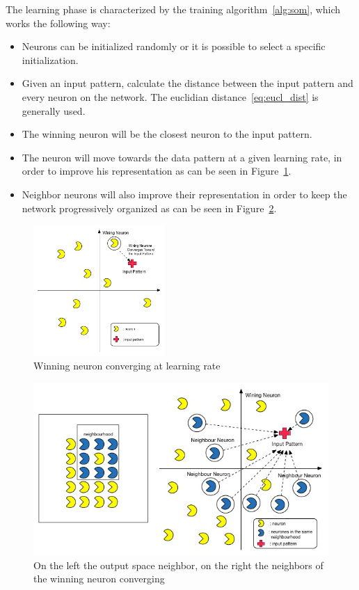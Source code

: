 

The learning phase is characterized by the training algorithm~\ref{alg:som}, which works the following way:
\begin{itemize}
  \item Neurons can be initialized randomly or it is possible to select a specific initialization.
  \item Given an input pattern, calculate the distance between the input pattern and every neuron on the network. The euclidian distance~\ref{eq:eucl_dist} is generally used.
  \item The winning neuron will be the closest neuron to the input pattern.
  \item The neuron will move towards the data pattern at a given learning rate, in order to improve his representation as can be seen in Figure~\ref{fig:4_wining_neuron_converge}.
  \item Neighbor neurons will also improve their representation in order to keep the network progressively organized as can be seen in Figure~\ref{fig:5_neighbours_converge}.
\end{itemize}



\begin{figure}
  \begin{center}
    \includegraphics[width=5cm]{images/4_wining_neuron_converge.jpg}
  \end{center}
  \caption{ Winning neuron converging at learning rate }
  \label{fig:4_wining_neuron_converge}
\end{figure}

\begin{figure}
  \begin{center}
    \includegraphics[width=12cm]{images/5_neighbours_converge.jpg}
  \end{center}
  \caption{ On the left the output space neighbor, on the right the neighbors of the winning neuron converging }
  \label{fig:5_neighbours_converge}
\end{figure}

